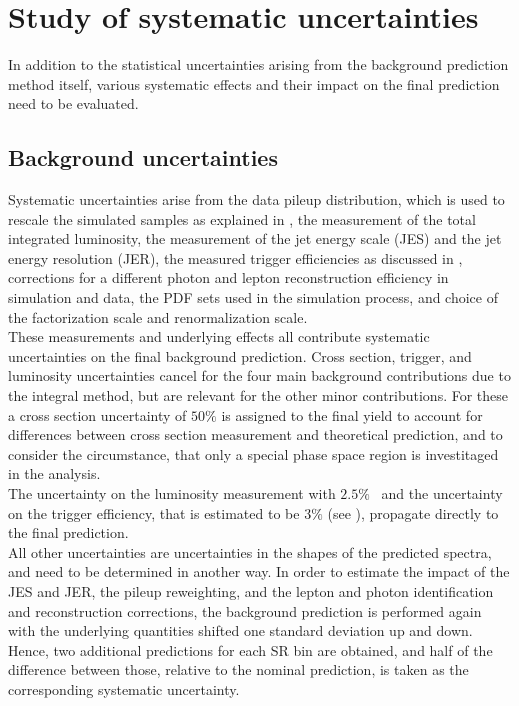 \section{Study of systematic uncertainties}\label{sec:Syst}
In addition to the statistical uncertainties arising from the background prediction method itself, various systematic effects and their impact on the final prediction need to be evaluated.

\subsection{Background uncertainties}
Systematic uncertainties arise from the data pileup distribution, which is used to rescale the simulated samples as explained in , the measurement of the total integrated luminosity, the measurement of the jet energy scale (JES) and the jet energy resolution (JER), the measured trigger efficiencies as discussed in , corrections for a different photon and lepton reconstruction efficiency in simulation and data, the PDF sets used in the simulation process, and choice of the factorization scale and renormalization scale.\\
These measurements and underlying effects all contribute systematic uncertainties on the final background prediction. Cross section, trigger, and luminosity uncertainties cancel for the four main background contributions due to the integral method, but are relevant for the other minor contributions. For these a cross section uncertainty of $50\%$ is assigned to the final yield to account for differences between cross section measurement and theoretical prediction, and to consider the circumstance, that only a special phase space region is investitaged in the analysis.\\
The uncertainty on the luminosity measurement with $2.5\%$~\cite{LumiUncert} and the uncertainty on the trigger efficiency, that is estimated to be $3\%$ (see ), propagate directly to the final prediction.\\
All other uncertainties are uncertainties in the shapes of the predicted spectra, and need to be determined in another way. In order to estimate the impact of the JES and JER, the pileup reweighting, and the lepton and photon identification and reconstruction corrections, the background prediction is performed again with the underlying quantities shifted one standard deviation up and down. Hence, two additional predictions for each SR bin are obtained, and half of the difference between those, relative to the nominal prediction, is taken as the corresponding systematic uncertainty.\\
